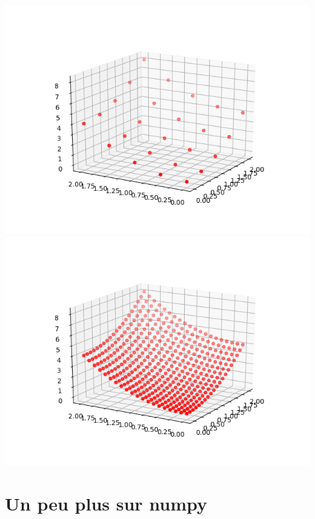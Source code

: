 \documentclass[11pt,class=report,crop=false]{standalone}
\begin{document}
\begin{itemize}
  \begin{center}
  \includegraphics[scale=\myscale,scale=0.5]{figures/pythonxy-numpy1}
  \includegraphics[scale=\myscale,scale=0.5]{figures/pythonxy-numpy2}
  \end{center}


\end{itemize}


\section{Un peu plus sur numpy}


\end{document}

